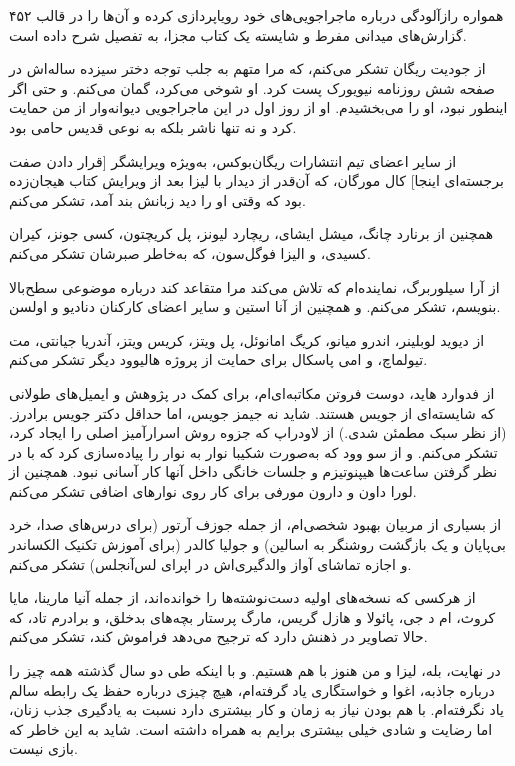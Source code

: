 ۴۵۲  
همواره رازآلودگی درباره ماجراجویی‌های خود رویاپردازی کرده و آن‌ها را در قالب گزارش‌های میدانی مفرط و شایسته یک کتاب مجزا، به تفصیل شرح داده است.  

از جودیت ریگان تشکر می‌کنم، که مرا متهم به جلب توجه دختر سیزده ساله‌اش در صفحه شش روزنامه نیویورک پست کرد. او شوخی می‌کرد، گمان می‌کنم. و حتی اگر اینطور نبود، او را می‌بخشیدم. او از روز اول در این ماجراجویی دیوانه‌وار از من حمایت کرد و نه تنها ناشر بلکه به نوعی قدیس حامی بود.  

از سایر اعضای تیم انتشارات ریگان‌بوکس، به‌ویژه ویرایشگر [قرار دادن صفت برجسته‌ای اینجا] کال مورگان، که آن‌قدر از دیدار با لیزا بعد از ویرایش کتاب هیجان‌زده بود که وقتی او را دید زبانش بند آمد، تشکر می‌کنم.  

همچنین از برنارد چانگ، میشل ایشای، ریچارد لیونز، پل کریچتون، کسی جونز، کیران کسیدی، و الیزا فوگل‌سون، که به‌خاطر صبرشان تشکر می‌کنم.  

از آرا سیلوربرگ، نماینده‌ام که تلاش می‌کند مرا متقاعد کند درباره موضوعی سطح‌بالا بنویسم، تشکر می‌کنم. و همچنین از آنا استین و سایر اعضای کارکنان دنادیو و اولسن.  

از دیوید لوبلینر، اندرو میانو، کریگ امانوئل، پل ویتز، کریس ویتز، آندریا جیانتی، مت تیولماچ، و امی پاسکال برای حمایت از پروژه هالیوود دیگر تشکر می‌کنم.  

از فدوارد هاید، دوست فروتن مکاتبه‌ای‌ام، برای کمک در پژوهش و ایمیل‌های طولانی که شایسته‌ای از جویس هستند. شاید نه جیمز جویس، اما حداقل دکتر جویس برادرز. (از نظر سبک مطمئن شدی.) از لاودراپ که جزوه روش اسرارآمیز اصلی را ایجاد کرد، تشکر می‌کنم. و از سو وود که به‌صورت شکیبا نوار به نوار را پیاده‌سازی کرد که با در نظر گرفتن ساعت‌ها هیپنوتیزم و جلسات خانگی داخل آنها کار آسانی نبود. همچنین از لورا داون و دارون مورفی برای کار روی نوارهای اضافی تشکر می‌کنم.  

از بسیاری از مربیان بهبود شخصی‌ام، از جمله جوزف آرتور (برای درس‌های صدا، خرد بی‌پایان و یک بازگشت روشنگر به اسالین) و جولیا کالدر (برای آموزش تکنیک الکساندر و اجازه تماشای آواز والدگیری‌اش در اپرای لس‌آنجلس) تشکر می‌کنم.  

از هرکسی که نسخه‌های اولیه دست‌نوشته‌ها را خوانده‌اند، از جمله آنیا مارینا، مایا کروث، ام د جی، پائولا و هازل گریس، مارگ پرستار بچه‌های بدخلق، و برادرم تاد، که حالا تصاویر در ذهنش دارد که ترجیح می‌دهد فراموش کند، تشکر می‌کنم.  

در نهایت، بله، لیزا و من هنوز با هم هستیم. و با اینکه طی دو سال گذشته همه چیز را درباره جاذبه، اغوا و خواستگاری یاد گرفته‌ام، هیچ چیزی درباره حفظ یک رابطه سالم یاد نگرفته‌ام. با هم بودن نیاز به زمان و کار بیشتری دارد نسبت به یادگیری جذب زنان، اما رضایت و شادی خیلی بیشتری برایم به همراه داشته است. شاید به این خاطر که بازی نیست.